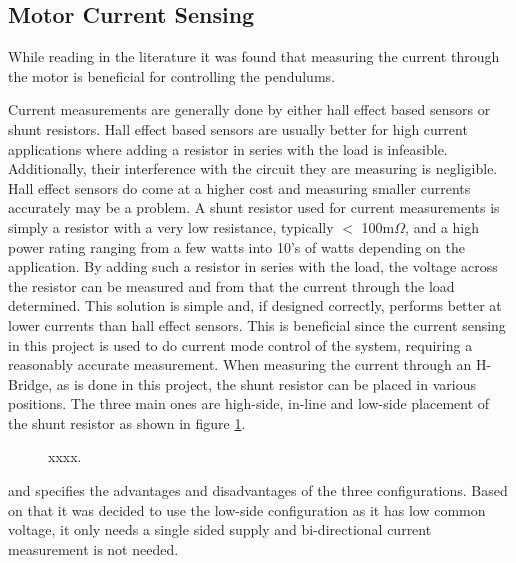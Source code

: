 \subsection{Motor Current Sensing}
While reading in the literature it was found that measuring the current through the motor is beneficial for controlling the pendulums.

Current measurements are generally done by either hall effect based sensors or shunt resistors. 
Hall effect based sensors are usually better for high current applications where adding a resistor in series with the load is infeasible. 
Additionally, their interference with the circuit they are measuring is negligible.
Hall effect sensors do come at a higher cost and measuring smaller currents accurately may be a problem.
A shunt resistor used for current measurements is simply a resistor with a very low resistance, typically $<$ 100m$\Omega$, and a high power rating ranging from a few watts into 10's of watts depending on the application.
By adding such a resistor in series with the load, the voltage across the resistor can be measured and from that the current through the load determined.
This solution is simple and, if designed correctly, performs better at lower currents than hall effect sensors.
This is beneficial since the current sensing in this project is used to do current mode control of the system, requiring a reasonably accurate measurement.
When measuring the current through an H-Bridge, as is done in this project, the shunt resistor can be placed in various positions.
The three main ones are high-side, in-line and low-side placement of the shunt resistor as shown in figure \ref{fig:shunt_measure_high_in_low}.

\begin{figure}[h]
	\centering
	\caption{xxxx.}
	\label{fig:shunt_measure_high_in_low}
\end{figure}

\cite{shunt_placement} and \cite{Current_Sense_Circuit_Collection} specifies the advantages and disadvantages of the three configurations.
Based on that it was decided to use the low-side configuration as it has low common voltage, it only needs a single sided supply and bi-directional current measurement is not needed.


